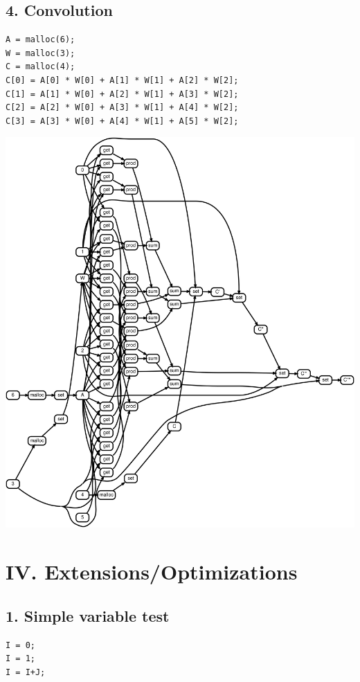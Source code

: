 \documentclass[sigplan,10pt,review,anonymous]{acmart}
\begin{document}
\subsection*{4. Convolution}

\begin{lstlisting}
A = malloc(6);
W = malloc(3);
C = malloc(4);
C[0] = A[0] * W[0] + A[1] * W[1] + A[2] * W[2];
C[1] = A[1] * W[0] + A[2] * W[1] + A[3] * W[2];
C[2] = A[2] * W[0] + A[3] * W[1] + A[4] * W[2];
C[3] = A[3] * W[0] + A[4] * W[1] + A[5] * W[2];
\end{lstlisting}

\includegraphics[scale=0.05]{rtd34}

\section*{IV. Extensions/Optimizations}

\subsection*{1. Simple variable test}

\begin{lstlisting}
I = 0;
I = 1;
I = I+J;
\end{lstlisting}
\end{document}
